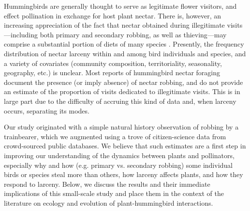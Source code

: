 \documentclass[fleqn,10pt,lineno]{wlpeerj}
\begin{document}
%
%
Hummingbirds are generally thought to serve as legitimate flower visitors, and effect pollination in exchange for host plant nectar. 
There is, however, an increasing appreciation of the fact that nectar obtained during illegitimate visits---including both primary and secondary robbing, as well as thieving---may comprise a substantial portion of diets of many species \citep{lara2001,irwin2010,boehm2018}. 
Presently, the frequency distribution of nectar larceny within and among bird individuals and species, and a variety of covariates (community composition, territoriality, seasonality, geography, etc.) is unclear. 
Most reports of hummingbird nectar foraging document the presence (or imply absence) of nectar robbing, and do not provide an estimate of the proportion of visits dedicated to illegitimate visits. 
This is in large part due to the difficulty of accruing this kind of data and, when larceny occurs, separating its modes.  

%
%
Our study originated with a simple natural history observation of robbing by a trainbearer, which we augmented using a trove of citizen-science data from crowd-sourced public databases. We believe that such estimates are a first step in improving our understanding of the dynamics between plants and pollinators, especially why and how (e.g. primary vs. secondary robbing) some individual birds or species steal more than others, how larceny affects plants, and how they respond to larceny. Below, we discuss the results and their immediate implications of this small-scale study and place them in the context of the literature on ecology and evolution of plant-hummingbird interactions.
\end{document}
